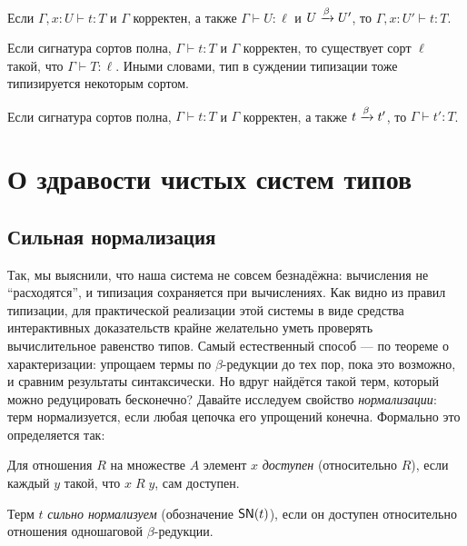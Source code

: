 \begin{lemma}
Если $\Gamma,x:U \vdash t : T$ и $\Gamma$ корректен,
а также $\Gamma \vdash U : \ell$ и $U \xrightarrow{\beta} U'$, то
$\Gamma,x:U' \vdash t : T$.
\end{lemma}

\begin{lemma}
Если сигнатура сортов полна, $\Gamma \vdash t : T$ и
$\Gamma$ корректен, то существует сорт $\ell$ такой,
что $\Gamma \vdash T : \ell$.
Иными словами, тип в суждении типизации тоже
типизируется некоторым сортом.
\end{lemma}

\begin{theorem}
Если сигнатура сортов полна, $\Gamma \vdash t : T$ и
$\Gamma$ корректен, а также $t \xrightarrow{\beta} t'$, то
$\Gamma \vdash t' : T$.
\end{theorem}

\section{О здравости чистых систем типов}

\subsection{Сильная нормализация}

Так, мы выяснили, что наша система не совсем
безнадёжна: вычисления не ``расходятся'', и типизация
сохраняется при вычислениях. Как видно из правил
типизации, для практической реализации этой системы в
виде средства интерактивных доказательств крайне
желательно уметь проверять вычислительное равенство
типов. Самый естественный способ --- по теореме о
характеризации: упрощаем термы по $\beta$-редукции
до тех пор, пока это возможно, и сравним результаты
синтаксически. Но вдруг найдётся такой терм, который
можно редуцировать бесконечно? Давайте исследуем
свойство \emph{нормализации}: терм нормализуется, если
любая цепочка его упрощений конечна. Формально это
определяется так:

\begin{definition}[Доступность]
Для отношения $R$ на множестве $A$ элемент $x$
\emph{доступен} (относительно $R$), если каждый
$y$ такой, что $x\;R\;y$, сам доступен.
\end{definition}

\begin{definition}
Терм $t$ \emph{сильно нормализуем}
(обозначение $\mathsf{SN}(t)$), если он доступен
относительно отношения одношаговой $\beta$-редукции.
\end{definition}

